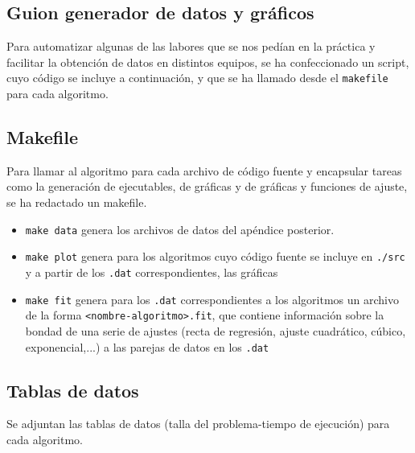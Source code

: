 \documentclass[a4paper, 11pt]{article} %
\begin{document}
\normalsize

\subsection{Guion generador de datos y gráficos}
\label{gengraf}
Para automatizar algunas de las labores que se nos pedían en la práctica
y facilitar la obtención de datos en distintos equipos, se ha confeccionado
un script, cuyo código se incluye a continuación, y que se ha llamado desde
el \texttt{makefile} para cada algoritmo.

\scriptsize\texttt{}
\normalsize

\subsection{Makefile}
\label{makefile}
Para llamar al algoritmo para cada archivo de código fuente y encapsular tareas
como la generación de ejecutables, de gráficas y de gráficas y funciones de ajuste,
se ha redactado un makefile.
\begin{itemize}
\item \texttt{make data} genera los archivos de datos del apéndice posterior.
\item \texttt{make plot} genera para los algoritmos cuyo código fuente se incluye 
en \texttt{./src} y a partir de los \texttt{.dat} correspondientes, las gráficas
\item \texttt{make fit} genera para los \texttt{.dat} correspondientes a los algoritmos
un archivo de la forma \texttt{<nombre-algoritmo>.fit}, que contiene información
sobre la bondad de una serie de ajustes (recta de regresión, ajuste cuadrático, cúbico, 
exponencial,...) a las parejas de datos en los \texttt{.dat}
\end{itemize}

\scriptsize\texttt{}\normalsize

\subsection{Tablas de datos}
Se adjuntan las tablas de datos (talla del problema-tiempo de ejecución) para
cada algoritmo.






\end{document}
